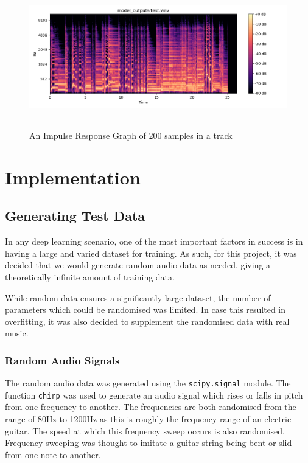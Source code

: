 \documentclass{l4proj}
\begin{document}
\begin{figure}
\centering
\includegraphics[width=6in,height=2.4in]{images/spect.png}
\caption{An Impulse Response Graph of 200 samples in a
track\label{fig:impulse}}
\end{figure}

\hypertarget{implementation}{%
\chapter{Implementation}\label{implementation}}

\hypertarget{generating-test-data}{%
\section{Generating Test Data}\label{generating-test-data}}

In any deep learning scenario, one of the most important factors in
success is in having a large and varied dataset for training. As such,
for this project, it was decided that we would generate random audio
data as needed, giving a theoretically infinite amount of training data.

While random data ensures a significantly large dataset, the number of
parameters which could be randomised was limited. In case this resulted
in overfitting, it was also decided to supplement the randomised data
with real music.

\hypertarget{random-audio-signals}{%
\subsection{Random Audio Signals}\label{random-audio-signals}}

The random audio data was generated using the \texttt{scipy.signal}
module. The function \texttt{chirp} was used to generate an audio signal
which rises or falls in pitch from one frequency to another. The
frequencies are both randomised from the range of 80Hz to 1200Hz as this
is roughly the frequency range of an electric guitar. The speed at which
this frequency sweep occurs is also randomised. Frequency sweeping was
thought to imitate a guitar string being bent or slid from one note to
another.
\end{document}
